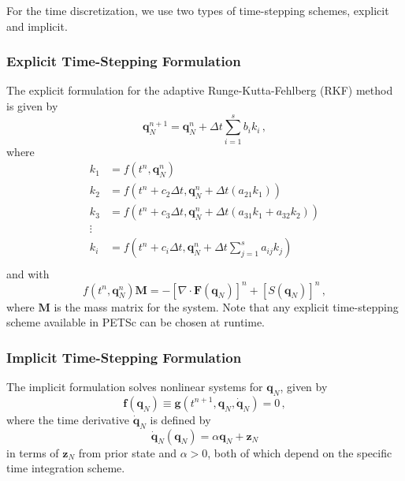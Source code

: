 For the time discretization, we use two types of time-stepping schemes, explicit and implicit.

\subsubsection{Explicit Time-Stepping Formulation}

The explicit formulation for the adaptive Runge-Kutta-Fehlberg (RKF) method is given by
\begin{equation}
       \mathbf{q}_N^{n+1} = \mathbf{q}_N^n + \Delta t \sum_{i=1}^{s} b_i k_i \, ,
\end{equation}
where
\begin{equation}
       \begin{aligned}
          k_1 &= f(t^n, \mathbf{q}_N^n)\\
          k_2 &= f(t^n + c_2 \Delta t, \mathbf{q}_N^n + \Delta t (a_{21} k_1))\\
          k_3 &= f(t^n + c_3 \Delta t, \mathbf{q}_N^n + \Delta t (a_{31} k_1 + a_{32} k_2))\\
          \vdots&\\
          k_i &= f\left(t^n + c_i \Delta t, \mathbf{q}_N^n + \Delta t \sum_{j=1}^s a_{ij} k_j \right)\\
       \end{aligned}
\end{equation}
and with
\begin{equation}
       f(t^n, \mathbf{q}_N^n) \mathbf{M}  = - [\nabla \cdot \mathbf{F}(\mathbf{q}_N)]^n + [S(\mathbf{q}_N)]^n \,,
\end{equation}
where $\mathbf{M}$ is the mass matrix for the system.
Note that any explicit time-stepping scheme available in PETSc can be chosen at runtime.

\subsubsection{Implicit Time-Stepping Formulation}

The implicit formulation solves nonlinear systems for $\mathbf q_N$, given by
\begin{equation}
       \mathbf f(\mathbf q_N) \equiv \mathbf g(t^{n+1}, \mathbf{q}_N, \mathbf{\dot{q}}_N) = 0 \, ,
       \label{eq:ts-implicit-ns}
\end{equation}
where the time derivative $\mathbf{\dot q}_N$ is defined by
\begin{equation}
      \mathbf{\dot{q}}_N(\mathbf q_N) = \alpha \mathbf q_N + \mathbf z_N
\end{equation}
in terms of $\mathbf z_N$ from prior state and $\alpha > 0$, both of which depend on the specific time integration scheme.

